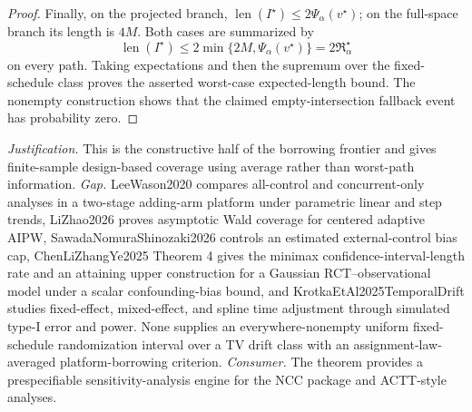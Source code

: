 \documentclass{article}
\begin{document}
\begin{proof}
Finally, on the projected branch,
\(\operatorname{len}(I^\star)\le2\Psi_\alpha(v^\star)\); on the full-space branch its length is \(4M\).  Both cases are summarized by
\[
\operatorname{len}(I^\star)
\le2\min\{2M,\Psi_\alpha(v^\star)\}
=2\mathfrak R_\alpha^\star
\]
on every path.  Taking expectations and then the supremum over the fixed-schedule class proves the asserted worst-case expected-length bound.  The nonempty construction shows that the claimed empty-intersection fallback event has probability zero.
\end{proof}
\par\smallskip\noindent \textit{Justification.} This is the constructive half of the borrowing frontier and gives finite-sample design-based coverage using average rather than worst-path information. \textit{Gap.} LeeWason2020 compares all-control and concurrent-only analyses in a two-stage adding-arm platform under parametric linear and step trends, LiZhao2026 proves asymptotic Wald coverage for centered adaptive AIPW, SawadaNomuraShinozaki2026 controls an estimated external-control bias cap, ChenLiZhangYe2025 Theorem 4 gives the minimax confidence-interval-length rate and an attaining upper construction for a Gaussian RCT--observational model under a scalar confounding-bias bound, and KrotkaEtAl2025TemporalDrift studies fixed-effect, mixed-effect, and spline time adjustment through simulated type-I error and power. None supplies an everywhere-nonempty uniform fixed-schedule randomization interval over a TV drift class with an assignment-law-averaged platform-borrowing criterion. \textit{Consumer.} The theorem provides a prespecifiable sensitivity-analysis engine for the NCC package and ACTT-style analyses.
\end{document}
